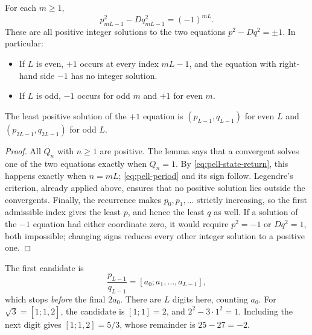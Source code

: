 \begin{theorem}
\label{thm:pell-convergents}
For each $m\ge1$,
\begin{equation}\label{eq:pell-period}
 p_{mL-1}^2-Dq_{mL-1}^2=(-1)^{mL}.
\end{equation}
These are all positive integer solutions to the two equations
$p^2-Dq^2=\pm1$. In particular:
\begin{itemize}
 \item If $L$ is even, $+1$ occurs at every index $mL-1$, and the
 equation with right-hand side $-1$ has no integer solution.
 \item If $L$ is odd, $-1$ occurs for odd $m$ and $+1$ for even $m$.
\end{itemize}
The least positive solution of the $+1$ equation is
$(p_{L-1},q_{L-1})$ for even $L$ and $(p_{2L-1},q_{2L-1})$ for odd $L$.
\end{theorem}
\begin{proof}
All $Q_n$ with $n\ge1$ are positive. The lemma says that a convergent
solves one of the two equations exactly when $Q_n=1$.
By \eqref{eq:pell-state-return}, this happens exactly when $n=mL$;
\eqref{eq:pell-period} and its sign follow. Legendre's criterion, already
applied above, ensures that no positive solution lies outside the
convergents. Finally, the recurrence makes $p_0,p_1,\ldots$ strictly
increasing, so the first admissible index gives the least $p$, and hence
the least $q$ as well. If a solution of the $-1$ equation had either
coordinate zero, it would require $p^2=-1$ or $Dq^2=1$, both impossible;
changing signs reduces every other integer solution to a positive one.
\end{proof}

\begin{warningbox}[title={Stop before the final digit}]
The first candidate is
\[
 \frac{p_{L-1}}{q_{L-1}}=[a_0;a_1,\ldots,a_{L-1}],
\]
which stops \emph{before} the final $2a_0$. There are $L$ digits here,
counting $a_0$. For $\sqrt3=[1;\overline{1,2}]$, the candidate is
$[1;1]=2$, and $2^2-3\cdot1^2=1$. Including the next digit gives
$[1;1,2]=5/3$, whose remainder is $25-27=-2$.
\end{warningbox}

